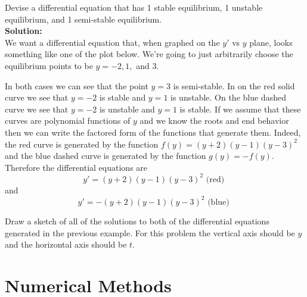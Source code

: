 \begin{example}
    Devise a differential equation that has 1 stable equilibrium, 1 unstable equilibrium,
    and 1 semi-stable equilibrium. \\ {\bf Solution:} \\
    We want a differential equation that, when graphed on the $y'$ vs $y$ plane, looks
    something like one of the plot below.  We're going to just arbitrarily choose the equilibrium
    points to be $y=-2, 1,$ and $3$.
    \begin{center}
    \end{center}
    In both cases we can see that the point $y=3$ is semi-stable.  In on the red solid
    curve we see that $y=-2$ is stable and $y=1$ is unstable.  On the blue dashed curve we
    see that $y=-2$ is unstable and $y=1$ is stable.  If we assume that these curves are
    polynomial functions of $y$ and we know the roots and end behavior then we can write the factored form
    of the functions that generate them.  Indeed, the red curve is generated by the
    function $f(y) = (y+2)(y-1)(y-3)^2$ and the blue dashed curve is generated by the
    function $g(y) = - f(y)$.  Therefore the differential equations are 
    \[ y' = (y+2)(y-1)(y-3)^2 \text{ (red) } \] 
    and
    \[ y' = -(y+2)(y-1)(y-3)^2 \text{ (blue) } \] 
\end{example}

\begin{problem}
    Draw a sketch of all of the solutions to both of the differential equations generated in the
    previous example.  For this problem the vertical axis should be $y$ and the horizontal
    axis should be $t$.
\end{problem}


\newpage


\newpage\section{Numerical Methods}


